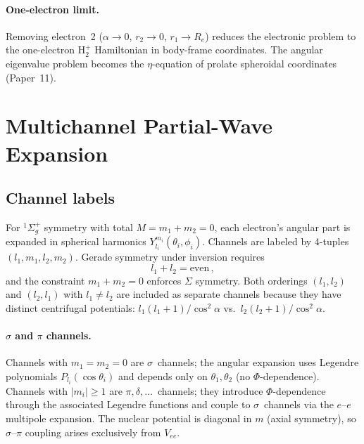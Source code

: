\documentclass[aps,pra,twocolumn,superscriptaddress,longbibliography]{revtex4-2}
\begin{document}
\paragraph{One-electron limit.}
Removing electron~2 ($\alpha \to 0$, $r_2 \to 0$, $r_1 \to R_e$)
reduces the electronic problem to the one-electron H$_2^+$ Hamiltonian
in body-frame coordinates.  The angular eigenvalue problem becomes the
$\eta$-equation of prolate spheroidal coordinates (Paper~11).

\section{Multichannel Partial-Wave Expansion}
\label{sec:multichannel}

\subsection{Channel labels}

For $^1\Sigma_g^+$ symmetry with total $M = m_1 + m_2 = 0$, each
electron's angular part is expanded in spherical harmonics
$Y_{l_i}^{m_i}(\theta_i,\phi_i)$.  Channels are labeled by
4-tuples $(l_1,m_1,l_2,m_2)$.  Gerade symmetry under inversion requires
\begin{equation}
  l_1 + l_2 = \text{even}\,,
  \label{eq:gerade}
\end{equation}
and the constraint $m_1 + m_2 = 0$ enforces $\Sigma$ symmetry.
Both orderings $(l_1,l_2)$ and $(l_2,l_1)$ with $l_1 \ne l_2$ are
included as separate channels because they have distinct centrifugal
potentials: $l_1(l_1+1)/\cos^2\!\alpha$ vs.\ $l_2(l_2+1)/\cos^2\!\alpha$.

\paragraph{$\sigma$ and $\pi$ channels.}
Channels with $m_1 = m_2 = 0$ are $\sigma$~channels; the angular
expansion uses Legendre polynomials $P_{l_i}(\cos\theta_i)$ and
depends only on $\theta_1,\theta_2$ (no $\Phi$-dependence).
Channels with $|m_i| \ge 1$ are $\pi,\delta,\ldots$~channels;
they introduce $\Phi$-dependence through the associated Legendre
functions and couple to $\sigma$~channels via the $e$--$e$ multipole
expansion.  The nuclear potential is diagonal in $m$ (axial symmetry),
so $\sigma$--$\pi$ coupling arises exclusively from $V_{ee}$.
\end{document}
